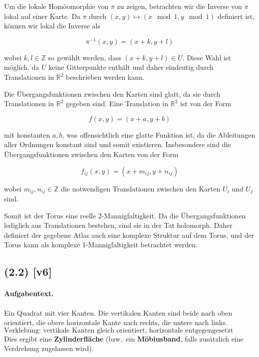 \documentclass[11pt,a4paper]{article}
\begin{document}
Um die lokale Homöomorphie von \(\pi\) zu zeigen, betrachten wir die Inverse von \(\pi\) lokal auf einer Karte. Da \(\pi\) durch \((x,y) \mapsto (x \mod 1, y \mod 1)\) definiert ist, können wir lokal die Inverse als

\[
\pi^{-1}(x,y) = (x+k, y+l)
\]

wobei \(k, l \in \mathbb{Z}\) so gewählt werden, dass \((x+k, y+l) \in U\). Diese Wahl ist möglich, da \(U\) keine Gitterpunkte enthält und daher eindeutig durch Translationen in \(\mathbb{R}^2\) beschrieben werden kann.

Die Übergangsfunktionen zwischen den Karten sind glatt, da sie durch Translationen in \(\mathbb{R}^2\) gegeben sind. Eine Translation in \(\mathbb{R}^2\) ist von der Form

\[
f(x,y) = (x+a, y+b)
\]

mit konstanten \(a, b\), was offensichtlich eine glatte Funktion ist, da die Ableitungen aller Ordnungen konstant sind und somit existieren. Insbesondere sind die Übergangsfunktionen zwischen den Karten von der Form

\[
f_{ij}(x,y) = (x + m_{ij}, y + n_{ij})
\]

wobei \(m_{ij}, n_{ij} \in \mathbb{Z}\) die notwendigen Translationen zwischen den Karten \(U_i\) und \(U_j\) sind.

Somit ist der Torus eine reelle 2-Mannigfaltigkeit. Da die Übergangsfunktionen lediglich aus Translationen bestehen, sind sie in der Tat holomorph. Daher definiert der gegebene Atlas auch eine komplexe Struktur auf dem Torus, und der Torus kann als komplexe 1-Mannigfaltigkeit betrachtet werden.


\subsection*{(2.2) [v6]}
\paragraph{Aufgabentext.}
Ein Quadrat mit vier Kanten. 
Die vertikalen Kanten sind beide nach oben orientiert, 
die obere horizontale Kante nach rechts, 
die untere nach links.  
\[
\text{Verklebung: vertikale Kanten gleich orientiert, horizontale entgegengesetzt orientiert.}
\]
Dies ergibt eine \textbf{Zylinderfläche} 
(bzw.\ ein \textbf{Möbiusband}, falls zusätzlich eine Verdrehung zugelassen wird).
\end{document}
